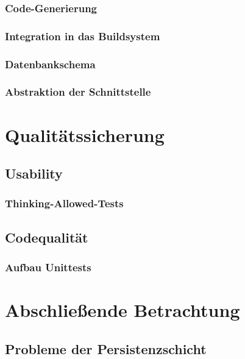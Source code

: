 \documentclass[a4paper,10pt]{article}
\begin{document}
\subsubsection{Code-Generierung}
\subsubsection{Integration in das Buildsystem}
\subsubsection{Datenbankschema}
\subsubsection{Abstraktion der Schnittstelle}

\section{Qualitätssicherung}
\subsection{Usability}
\subsubsection{Thinking-Allowed-Tests}
\subsection{Codequalität} 
\subsubsection{Aufbau Unittests}

\section{Abschließende Betrachtung}
\subsection{Probleme der Persistenzschicht}
\end{document}

